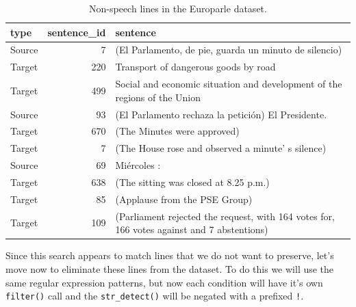 \documentclass[
]{article}
\newenvironment{Shaded}{\begin{snugshade}}{\end{snugshade}}
\newcommand{\AttributeTok}[1]{\textcolor[rgb]{0.77,0.63,0.00}{#1}}
\newcommand{\CommentTok}[1]{\textcolor[rgb]{0.56,0.35,0.01}{\textit{#1}}}
\newcommand{\FunctionTok}[1]{\textcolor[rgb]{0.00,0.00,0.00}{#1}}
\newcommand{\NormalTok}[1]{#1}
\newcommand{\OtherTok}[1]{\textcolor[rgb]{0.56,0.35,0.01}{#1}}
\newcommand{\SpecialCharTok}[1]{\textcolor[rgb]{0.00,0.00,0.00}{#1}}
\newcommand{\StringTok}[1]{\textcolor[rgb]{0.31,0.60,0.02}{#1}}
\begin{document}
\begin{table}

\caption{\label{tab:td-europarle-search-non-speech}Non-speech lines in the Europarle dataset.}
\centering
\begin{tabular}[t]{lrl}
\toprule
type & sentence\_id & sentence\\
\midrule
Source & 7 & (El Parlamento, de pie, guarda un minuto de silencio)\\
Target & 220 & Transport of dangerous goods by road\\
Target & 499 & Social and economic situation and development of the regions of the Union\\
Source & 93 & (El Parlamento rechaza la petición) El Presidente.\\
Target & 670 & (The Minutes were approved)\\
\addlinespace
Target & 7 & (The House rose and observed a minute' s silence)\\
Source & 69 & Miércoles :\\
Target & 638 & (The sitting was closed at 8.25 p.m.)\\
Target & 85 & (Applause from the PSE Group)\\
Target & 109 & (Parliament rejected the request, with 164 votes for, 166 votes against and 7 abstentions)\\
\bottomrule
\end{tabular}
\end{table}

Since this search appears to match lines that we do not want to preserve, let's move now to eliminate these lines from the dataset. To do this we will use the same regular expression patterns, but now each condition will have it's own \texttt{filter()} call and the \texttt{str\_detect()} will be negated with a prefixed \texttt{!}.

\begin{Shaded}
\end{Shaded}
\end{document}
